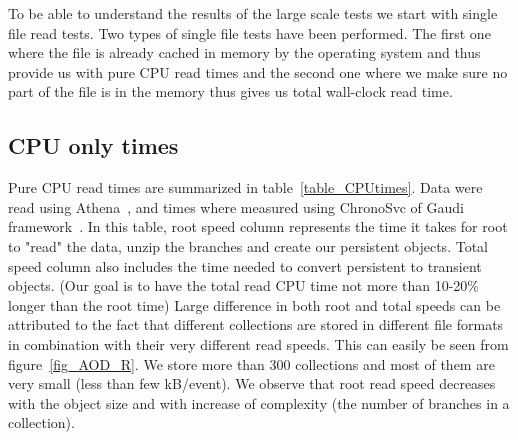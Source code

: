 \documentclass[a4paper]{jpconf}
\begin{document}
To be able to understand the results of the large scale tests we start with single file read tests. Two types of single file tests have been performed. The first one where the file is already cached in memory by the operating system and thus provide us with pure CPU read times and the second one where we make sure no part of the file is in the memory thus gives us total wall-clock read time. 

\subsection{CPU only times}

Pure CPU read times are summarized in table~\ref{table_CPUtimes}. Data were read using Athena~\cite{athena}, and times where measured using ChronoSvc of Gaudi framework~\cite{gaudi}. In this table, root speed column represents the time it takes for root to "read" the data, unzip the branches and create our persistent objects. Total speed column also includes the time needed to convert persistent to transient objects. (Our goal is to have the total read CPU time not more than  10-20\% longer than the root time) Large difference in both root and total speeds can be attributed to the fact that different collections are stored in different file formats in combination with their very different read speeds. This can easily be seen from figure~\ref{fig_AOD_R}. We store more than 300 collections and most of them are very small (less than few kB/event). We observe that root read speed decreases with the object size and with increase of complexity (the number of branches in a collection).
\end{document}
